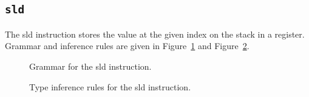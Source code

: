 \subsection{\texttt{sld}}\label{subsec:nstar-instructionset-stack-sld}

The {\Iformat sld} instruction stores the value at the given index on the stack in a register.
Grammar and inference rules are given in Figure~\ref{fig:nstar-instructionset-stack-sld-grammar} and Figure~\ref{fig:nstar-instructionset-stack-sld-typerules}.

\begin{figure}[H]
	\centering


	\caption{Grammar for the {\Iformat sld} instruction.}
	\label{fig:nstar-instructionset-stack-sld-grammar}
\end{figure}

\begin{figure}[H]
	\centering


	\caption{Type inference rules for the {\Iformat sld} instruction.}
	\label{fig:nstar-instructionset-stack-sld-typerules}
\end{figure}

